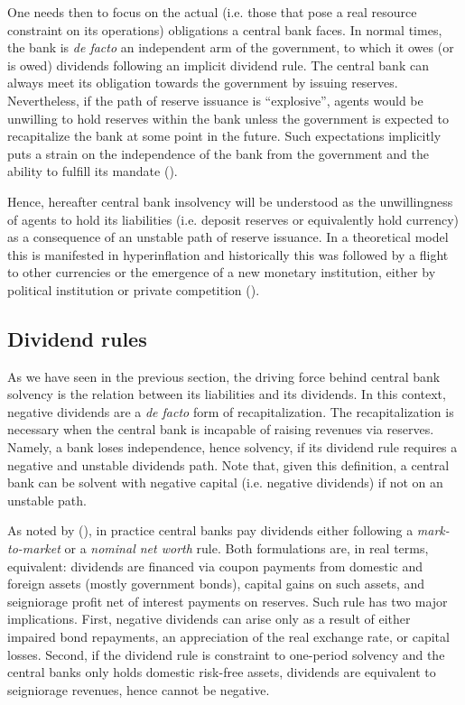 \documentclass[american]{scrartcl}
\newcommand{\citein}[1]{\citeauthor{#1} (\citeyear{#1})}
\begin{document}
One needs then to focus on the actual (i.e. those that pose a real resource constraint on its operations) obligations a central bank faces. In normal times, the bank is \textit{de facto} an independent arm of the government, to which it owes (or is owed) dividends following an implicit dividend rule. The central bank can always meet its obligation towards the government by issuing reserves. Nevertheless, if the path of reserve issuance is ``explosive'', agents would be unwilling to hold reserves within the bank unless the government is expected to recapitalize the bank at some point in the future. Such expectations implicitly puts a strain on the independence of the bank from the government and the ability to fulfill its mandate (\cite{deHaan2016}).

Hence, hereafter central bank insolvency will be understood as the unwillingness of agents to hold its liabilities (i.e. deposit reserves or equivalently hold currency) as a consequence of an unstable path of reserve issuance. In a theoretical model this is manifested in hyperinflation and historically this was followed by a flight to other currencies or the emergence of a new monetary institution, either by political institution or private competition (\cite{Flandreau2007}). %

\subsection{Dividend rules}

As we have seen in the previous section, the driving force behind central bank solvency is the relation between its liabilities and its dividends. In this context, negative dividends are a \textit{de facto} form of recapitalization. The recapitalization is necessary when the central bank is incapable of raising revenues via reserves. Namely, a bank loses independence, hence solvency, if its dividend rule requires a negative and unstable dividends path. Note that, given this definition, a central bank can be solvent with negative capital (i.e. negative dividends) if not on an unstable path.

As noted by \citein{Hall2015}, in practice central banks pay dividends either following a \textit{mark-to-market} or a \textit{nominal net worth} rule. Both formulations are, in real terms, equivalent: dividends are financed via coupon payments from domestic and foreign assets (mostly government bonds), capital gains on such assets, and seigniorage profit net of interest payments on reserves. Such rule has two major implications. First, negative dividends can arise only as a result of either impaired bond repayments, an appreciation of the real exchange rate, or capital losses. Second, if the dividend rule is constraint to one-period solvency and the central banks only holds domestic risk-free assets, dividends are equivalent to seigniorage revenues, hence cannot be negative.
\end{document}

